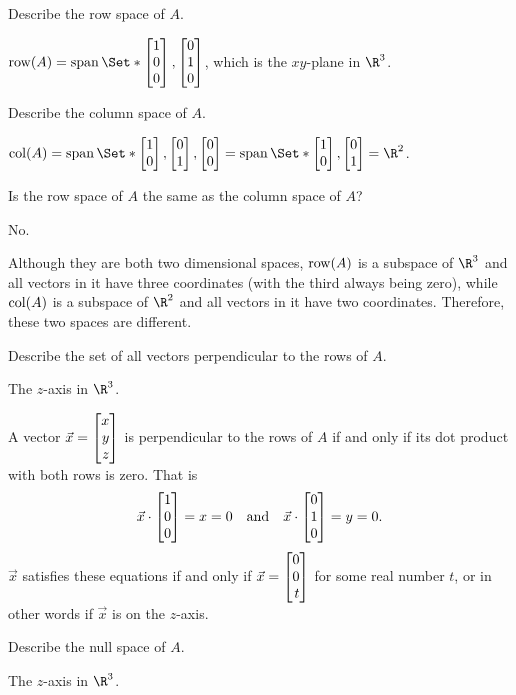 	\begin{parts}
		\item Describe the row space of $A$.
			\begin{solution}
				$\Row(A) = \Span\Set*{\mat{1\\0\\0},\mat{0\\1\\0}}$,
				which is the $xy$-plane in $\R^3$.
			\end{solution}
		\item Describe the column space of $A$.
			\begin{solution}
				$\Col(A)=\Span\Set*{\mat{1\\0},\mat{0\\1},\mat{0\\0}}
					=\Span\Set*{\mat{1\\0},\mat{0\\1}}=\R^2$.
			\end{solution}
		\item Is the row space of $A$ the same as the column space of $A$?
			\begin{solution}
				No.

				Although they are both two dimensional spaces, $\operatorname{row}(A)$ is a
				subspace of $\R^3$ and all vectors in it have three coordinates
				(with the third always being zero), while $\operatorname{col}(A)$ is a
				subspace of $\R^2$ and all vectors in it have two coordinates.
				Therefore, these two spaces are different.
			\end{solution}
		\item Describe the set of all vectors perpendicular to the rows of $A$.
			\begin{solution}
				The $z$-axis in $\R^3$.

				A vector $\vec x=\mat{x\\y\\z}$ is perpendicular to the rows of $A$
				if and only if its dot product with both rows is zero. That is
				\[
					\vec x\cdot\mat{1\\0\\0} = x = 0
					\quad \text{and} \quad
					\vec x\cdot\mat{0\\1\\0} = y = 0.
				\]
				$\vec x$ satisfies these equations if and only if $\vec x=\mat{0\\0\\t}$
				for some real number $t$, or in other words if $\vec x$ is on the
				$z$-axis.
			\end{solution}
		\item Describe the null space of $A$.
			\begin{solution}
				The $z$-axis in $\R^3$.


\end{solution}
\end{parts}
